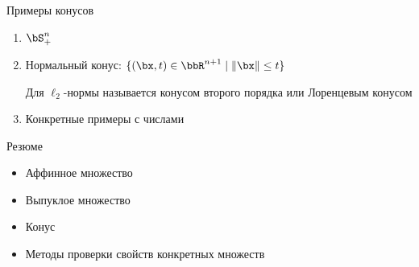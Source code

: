 \documentclass[12pt,russian]{beamer}
\begin{document}
\begin{frame}{Примеры конусов}
\begin{enumerate}
\item $\bS^n_+$
\item Нормальный конус: $\{ (\bx, t) \in \bbR^{n+1} \; | \; \| \bx \| \leq t \}$ 

Для $\ell_2$-нормы называется конусом второго порядка или Лоренцевым конусом
\item Конкретные примеры с числами
\end{enumerate}
\end{frame}

\begin{frame}{Резюме}
\begin{itemize}
\item Аффинное множество
\item Выпуклое множество
\item Конус
\item Методы проверки свойств конкретных множеств
\end{itemize}
\end{frame}
\end{document}
